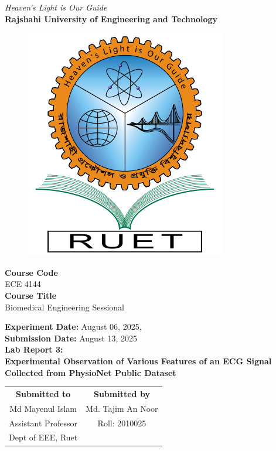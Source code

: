 \vspace*{\fill}
\begin{center}

    \emph{Heaven's Light is Our Guide} \\
    \textbf{Rajshahi University of Engineering and Technology} \\

    \begin{figure}[H]
        \centering
        \includegraphics[scale=.34]{images/RUET_logo.png}
        \label{fig:ruet_logo}
    \end{figure}
    \vspace{5mm}

    \textbf{Course Code}\\
    ECE 4144\\
    \vspace{3mm}
    \textbf{Course Title}\\
    Biomedical Engineering Sessional

    \vspace{5mm}
    \textbf{Experiment Date:} {August 06, 2025},\\
    \textbf{Submission Date:} {August 13, 2025}\\

    \vspace{5mm}
    \textbf{Lab Report 3: \\
        Experimental Observation of Various Features of an ECG
        Signal Collected from PhysioNet Public Dataset}

    \vspace{15mm}

    \begin{tabular}{c|c}
        \textbf{Submitted to} & \textbf{Submitted by} \\
        Md Mayenul Islam      & Md. Tajim An Noor     \\
        Assistant Professor   & Roll: 2010025         \\
        Dept of EEE, Ruet     &                       \\
    \end{tabular}

\end{center}
\vspace*{\fill}
